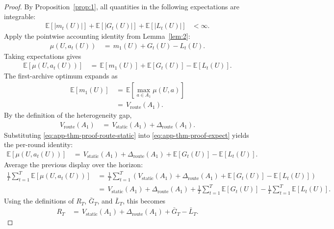 \documentclass{article} %
\begin{document}
\begin{proof}
By Proposition~\ref{prop:1}, all quantities in the following expectations are integrable:
\begin{align}
\label{eq:app-thm-proof-integrability}
\mathbb{E}[|m_t(U)|]
+
\mathbb{E}[|G_t(U)|]
+
\mathbb{E}[|L_t(U)|]
&<
\infty.
\end{align}
Apply the pointwise accounting identity from Lemma~\ref{lem:2}:
\begin{align}
\label{eq:app-thm-proof-pointwise}
\mu(U,a_t(U))
&\,=\,
m_1(U)+G_t(U)-L_t(U).
\end{align}
Taking expectations gives
\begin{align}
\label{eq:app-thm-proof-expect}
\mathbb{E}[\mu(U,a_t(U))]
&\,=\,
\mathbb{E}[m_1(U)]
+
\mathbb{E}[G_t(U)]
-
\mathbb{E}[L_t(U)].
\end{align}
The first-archive optimum expands as
\begin{align}
\label{eq:app-thm-proof-m1}
\mathbb{E}[m_1(U)]
&\,=\,
\mathbb{E}\!\left[\max_{a\in A_1}\mu(U,a)\right]
\\
&\,=\,
V_{\mathrm{route}}(A_1).
\end{align}
By the definition of the heterogeneity gap,
\begin{align}
\label{eq:app-thm-proof-route-static}
V_{\mathrm{route}}(A_1)
&\,=\,
V_{\mathrm{static}}(A_1)
+
\Delta_{\mathrm{route}}(A_1).
\end{align}
Substituting \eqref{eq:app-thm-proof-route-static} into \eqref{eq:app-thm-proof-expect} yields the per-round identity:
\begin{align}
\label{eq:app-thm-proof-per-round}
\mathbb{E}[\mu(U,a_t(U))]
&\,=\,
V_{\mathrm{static}}(A_1)
+
\Delta_{\mathrm{route}}(A_1)
+
\mathbb{E}[G_t(U)]
-
\mathbb{E}[L_t(U)].
\end{align}
Average the previous display over the horizon:
\begin{align}
\label{eq:app-thm-proof-average-start}
\frac{1}{T}\sum_{t=1}^{T}\mathbb{E}[\mu(U,a_t(U))]
&\,=\,
\frac{1}{T}\sum_{t=1}^{T}
\left(
V_{\mathrm{static}}(A_1)
+
\Delta_{\mathrm{route}}(A_1)
+
\mathbb{E}[G_t(U)]
-
\mathbb{E}[L_t(U)]
\right)
\\
&\,=\,
V_{\mathrm{static}}(A_1)
+
\Delta_{\mathrm{route}}(A_1)
+
\frac{1}{T}\sum_{t=1}^{T}\mathbb{E}[G_t(U)]
-
\frac{1}{T}\sum_{t=1}^{T}\mathbb{E}[L_t(U)].
\end{align}
Using the definitions of \(R_T\), \(\bar G_T\), and \(\bar L_T\), this becomes
\begin{align}
\label{eq:app-thm-proof-average-final}
R_T
&\,=\,
V_{\mathrm{static}}(A_1)
+
\Delta_{\mathrm{route}}(A_1)
+
\bar G_T
-
\bar L_T.
\end{align}
\end{proof}
\end{document}
